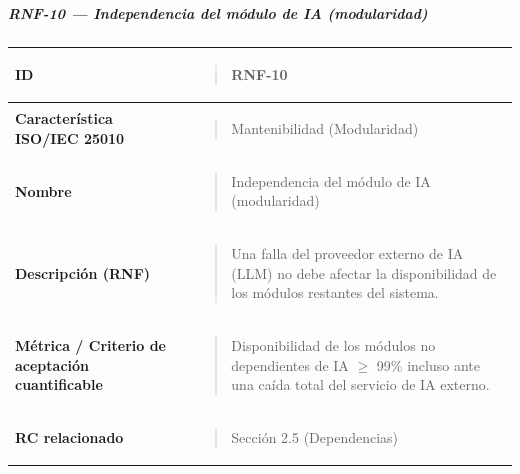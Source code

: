 \documentclass[
]{article}
\newcounter{none} %
\begin{document}
\subparagraph{RNF-10 --- Independencia del módulo de IA
(modularidad)}\label{rnf-10-independencia-del-modulo-de-ia-modularidad}

{\def\LTcaptype{none} %
\begin{longtable}[]{@{}
  >{\raggedright\arraybackslash}p{}
  >{\raggedright\arraybackslash}p{}@{}}
\toprule\noalign{}
\begin{minipage}[b]{\linewidth}\raggedright
\textbf{ID}
\end{minipage} & \begin{minipage}[b]{\linewidth}\raggedright
\begin{quote}
RNF-10
\end{quote}
\end{minipage} \\
\midrule\noalign{}
\endhead
\bottomrule\noalign{}
\endlastfoot
\textbf{Característica ISO/IEC 25010} & \begin{minipage}[t]{\linewidth}\raggedright
\begin{quote}
Mantenibilidad (Modularidad)
\end{quote}
\end{minipage} \\
\textbf{Nombre} & \begin{minipage}[t]{\linewidth}\raggedright
\begin{quote}
Independencia del módulo de IA (modularidad)
\end{quote}
\end{minipage} \\
\textbf{Descripción (RNF)} & \begin{minipage}[t]{\linewidth}\raggedright
\begin{quote}
Una falla del proveedor externo de IA (LLM) no debe afectar la
disponibilidad de los módulos restantes del sistema.
\end{quote}
\end{minipage} \\
\textbf{Métrica / Criterio de aceptación cuantificable} & \begin{minipage}[t]{\linewidth}\raggedright
\begin{quote}
Disponibilidad de los módulos no dependientes de IA \(\geq\) 99\%
incluso ante una caída total del servicio de IA externo.
\end{quote}
\end{minipage} \\
\textbf{RC relacionado} & \begin{minipage}[t]{\linewidth}\raggedright
\begin{quote}
Sección 2.5 (Dependencias)
\end{quote}
\end{minipage} \\
\end{longtable}
}
\end{document}

